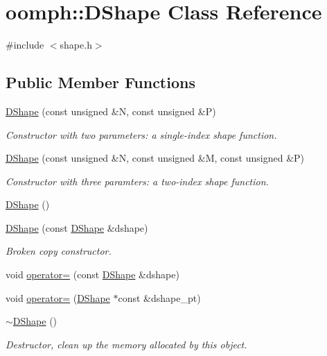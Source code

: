 \hypertarget{classoomph_1_1DShape}{}\section{oomph\+:\+:D\+Shape Class Reference}
\label{classoomph_1_1DShape}


{\ttfamily \#include $<$shape.\+h$>$}

\subsection*{Public Member Functions}
\begin{DoxyCompactItemize}
\item 
\hyperlink{classoomph_1_1DShape_abeb261fc4fe276c22df040f8f754b151}{D\+Shape} (const unsigned \&N, const unsigned \&P)
\begin{DoxyCompactList}\small\item\em Constructor with two parameters\+: a single-\/index shape function. \end{DoxyCompactList}\item 
\hyperlink{classoomph_1_1DShape_a9b448ecb15766d223b7cd4b668729174}{D\+Shape} (const unsigned \&N, const unsigned \&M, const unsigned \&P)
\begin{DoxyCompactList}\small\item\em Constructor with three paramters\+: a two-\/index shape function. \end{DoxyCompactList}\item 
\hyperlink{classoomph_1_1DShape_a7a9884025650edf558112081e53d4dbb}{D\+Shape} ()
\item 
\hyperlink{classoomph_1_1DShape_a0624fe8be38d00a98802c6230acd7ed2}{D\+Shape} (const \hyperlink{classoomph_1_1DShape}{D\+Shape} \&dshape)
\begin{DoxyCompactList}\small\item\em Broken copy constructor. \end{DoxyCompactList}\item 
void \hyperlink{classoomph_1_1DShape_a65273775f2720c51a7d4c2e9b5d5a8a9}{operator=} (const \hyperlink{classoomph_1_1DShape}{D\+Shape} \&dshape)
\item 
void \hyperlink{classoomph_1_1DShape_a50bb345fa38feb3b72244d94a0dbaf50}{operator=} (\hyperlink{classoomph_1_1DShape}{D\+Shape} $\ast$const \&dshape\+\_\+pt)
\item 
\hyperlink{classoomph_1_1DShape_a438b78cc767e134d1837bbf181cf4c07}{$\sim$\+D\+Shape} ()
\begin{DoxyCompactList}\small\item\em Destructor, clean up the memory allocated by this object. \end{DoxyCompactList}\item 

\end{DoxyCompactItemize}
